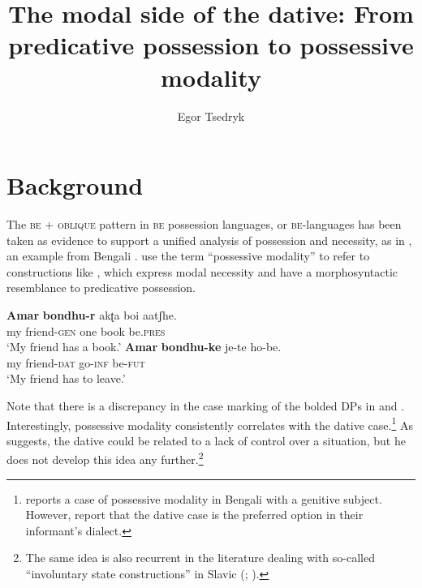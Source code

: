 \documentclass[output=paper,colorlinks,citecolor=brown,modfonts,nonflat]{langsci/langscibook}
\author{Egor Tsedryk	\affiliation{Saint Mary’s University}}
\title{The modal side of the dative: From predicative possession to possessive modality}
\begin{document}
\maketitle 
{}

\section{Background}\label{sec:tsedryk:1}

The \textsc{be} + \textsc{oblique} pattern in \textsc{be} possession languages, or \textsc{be}{}-languages \citep{Isačenko1974} has been taken as evidence to support a unified analysis of possession and necessity, as in , an example from Bengali \citep[43]{BjorkmanCowper2016}. \citet[31]{BjorkmanCowper2016} use the term “possessive modality” to refer to constructions like , which express modal necessity and have a morphosyntactic resemblance to predicative possession. 

\ea%
    \label{ex:tsedryk:1}
    \ea\label{ex:tsedryk:1a}
    \gll    \textbf{Amar}    \textbf{bondhu-r}     {akʈa}   {boi}     {aatʃhe}.\\
            my       friend-\textsc{gen}  one     book   be.\textsc{pres}\\
    \glt    ‘My friend has a book.’
    \ex\label{ex:tsedryk:1b}
    \gll    \textbf{Amar}    \textbf{bondhu-ke}    {je-te}     {ho-be}.\\
            my friend-\textsc{dat}    go-\textsc{inf}   be-\textsc{fut}\\
    \glt    ‘My friend has to leave.’
    \z
\z


Note that there is a discrepancy in the case marking of the bolded DPs in  and . Interestingly, possessive modality consistently correlates with the dative case.\footnote{\citet[example 7]{Bhatt1997} reports a case of possessive modality in Bengali with a genitive subject. However, \citet[46]{BjorkmanCowper2016} report that the dative case is the preferred option in their informant’s dialect.} As \citet[section 8.1]{Bhatt1997} suggests, the dative could be related to a lack of control over a situation, but he does not develop this idea any further.\footnote{The same idea is also recurrent in the literature dealing with so-called “involuntary state constructions” in Slavic (\citealt[154]{Rivero2009}; \citealt[312]{RiveroArregui2012}).}  
\end{document}
